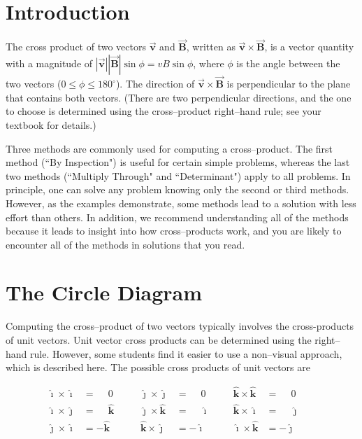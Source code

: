\documentclass{article}
\newcommand{\ihat}[0]{\hat{\boldsymbol{\imath}}}
\newcommand{\jhat}[0]{\hat{\boldsymbol{\jmath}}}
\newcommand{\khat}[0]{\hat{\boldsymbol{k}}}
\newcommand{\bfvec}[1]{\vec{\mathbf{#1}}}
\begin{document}
\section{Introduction}

The cross product of two vectors $\bfvec{v}$ and $\bfvec{B}$, written as $\bfvec{v}\times\bfvec{B}$, is a vector quantity with a magnitude of $|\bfvec{v}||\bfvec{B}|\sin\phi = vB\sin\phi$, where $\phi$ is the angle between the two vectors ($0 \le\phi \le 180^{\circ}$). The direction of $\bfvec{v}\times\bfvec{B}$ is perpendicular to the plane that contains both vectors. (There are two perpendicular directions, and the one to choose is determined using the cross--product right--hand rule; see your textbook for details.)

Three methods are commonly used for computing a cross--product. The first method (``By Inspection") is useful for certain simple problems, whereas the last two methods (``Multiply Through" and ``Determinant") apply to all problems. In principle, one can solve any problem knowing only the second or third methods. However, as the examples demonstrate, some methods lead to a solution with less effort than others. In addition, we recommend understanding all of the methods because it leads to insight into how cross--products work, and you are likely to encounter all of the methods in solutions that you read.

\section{The Circle Diagram}

Computing the cross--product of two vectors typically involves the cross-products of unit vectors. Unit vector cross products can be determined using the right--hand rule. However, some students find it easier to use a non--visual approach, which is described here. The possible cross products of unit vectors are

$$
\begin{align*}
\ihat\times\ihat & = \phantom{-}0 \qquad &
\jhat\times\jhat & = \phantom{-}0 \qquad &
\khat\times\khat & = \phantom{-}0 \qquad
\\
\ihat\times\jhat & =  \phantom{-}\khat &
\jhat\times\khat & = \phantom{-}\ihat  &
\khat\times\ihat & = \phantom{-}\jhat
\\
\jhat\times\ihat & = -\khat &
\khat\times\jhat & = -\ihat &
\ihat\times\khat & = -\jhat
\end{align*}
$$
\end{document}
